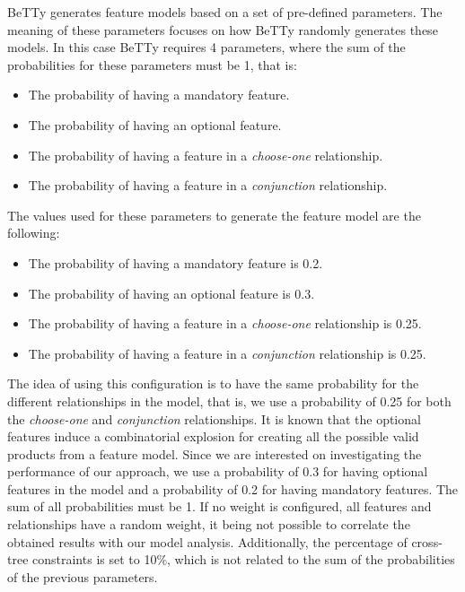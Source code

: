 BeTTy generates feature models based on a set of pre-defined parameters.
The meaning of these parameters focuses on how
BeTTy randomly generates these models.
In this case BeTTy requires 4 parameters, where the sum of the probabilities
for these parameters must be 1, that is:

\begin{itemize}
        \item The probability of having a mandatory feature.
        \item The probability of having an optional feature.
        \item The probability of having a feature in a \emph{choose-one} relationship.
        \item The probability of having a feature in a \emph{conjunction} relationship.
\end{itemize}

The values used for these parameters to generate the feature model are the following:

\begin{itemize}
        \item The probability of having a mandatory feature is 0.2.
        \item The probability of having an optional feature is 0.3.
        \item The probability of having a feature in a \emph{choose-one} relationship is 0.25.
        \item The probability of having a feature in a \emph{conjunction} relationship is 0.25.
\end{itemize}


The idea of using this configuration is to have the same probability for the different
relationships in the model, that is, we use a probability of 0.25 for both the
\emph{choose-one} and \emph{conjunction} relationships.
It is known that the optional features induce a  combinatorial explosion for creating
all the possible valid products from a feature model. Since we are interested on investigating
the performance of our approach, we use a probability of 0.3 for having optional features in
the model and a probability of 0.2 for having mandatory features.
The sum of all probabilities must be 1. If no weight is configured, all features and
relationships have a random weight, it being not possible to correlate the obtained results with
our model analysis.
Additionally, the percentage of cross-tree constraints is set to 10\%, which is not related to
the sum of the probabilities of the previous parameters.

